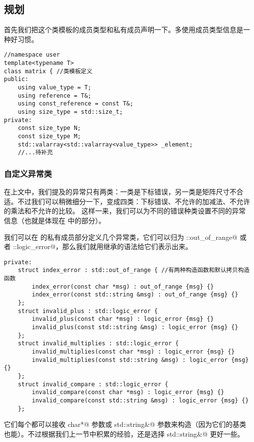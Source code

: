 \subsection*{规划}
首先我们把这个类模板的成员类型和私有成员声明一下。多使用成员类型信息是一种好习惯。
\begin{lstlisting}
//namespace user
template<typename T>
class matrix { //类模板定义
public:
    using value_type = T;
    using reference = T&;
    using const_reference = const T&;
    using size_type = std::size_t;
private:
    const size_type N;
    const size_type M;
    std::valarray<std::valarray<value_type>> _element;
    //...待补充
\end{lstlisting}\par
\subsubsection*{自定义异常类}
在上文中，我们提及的异常只有两类：一类是下标错误，另一类是矩阵尺寸不合适。不过我们可以稍微细分一下，变成四类：下标错误、不允许的加减法、不允许的乘法和不允许的比较。
这样一来，我们可以为不同的错误种类设置不同的异常信息（也就是体现在 \lstinline@what@ 中的部分）。\par
我们可以在 \lstinline@matrix@ 的私有成员部分定义几个异常类，它们可以归为 \lstinline@std::out_of_range@ 或者 \lstinline@std::logic_error@，那么我们就用继承的语法给它们表示出来。\par
\begin{lstlisting}
private:
    struct index_error : std::out_of_range { //有两种构造函数和默认拷贝构造函数
        index_error(const char *msg) : out_of_range {msg} {}
        index_error(const std::string &msg) : out_of_range {msg} {}
    };
    struct invalid_plus : std::logic_error {
        invalid_plus(const char *msg) : logic_error {msg} {}
        invalid_plus(const std::string &msg) : logic_error {msg} {}
    };
    struct invalid_multiplies : std::logic_error {
        invalid_multiplies(const char *msg) : logic_error {msg} {}
        invalid_multiplies(const std::string &msg) : logic_error {msg} {}
    };
    struct invalid_compare : std::logic_error {
        invalid_compare(const char *msg) : logic_error {msg} {}
        invalid_compare(const std::string &msg) : logic_error {msg} {}
    };
\end{lstlisting}
它们每个都可以接收 \lstinline@const char*@ 参数或 \lstinline@cons std::string&@ 参数来构造（因为它们的基类也能）。不过根据我们上一节中积累的经验，还是选择 \lstinline@const std::string&@ 更好一些。\par
